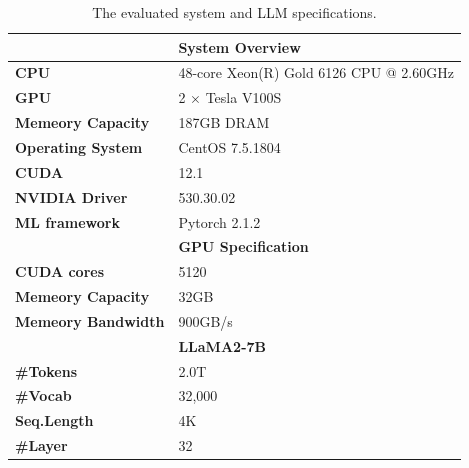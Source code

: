 \begin{table}[!hb]
\centering
\caption{The evaluated system and LLM specifications. }
\label{tab:system}
\begin{tabular}{ll} 
\toprule
                           & \textbf{System Overview}  \\
                           \midrule
\textbf{CPU}               & 48-core Xeon(R) Gold 6126 CPU @ 2.60GHz       \\
\textbf{GPU}               & 2 $\times$ Tesla V100S       \\
\textbf{Memeory Capacity}  & 187GB DRAM                                    \\
\textbf{Operating System}  & CentOS 7.5.1804                               \\
\textbf{CUDA}              & 12.1                                          \\
\textbf{NVIDIA Driver}     & 530.30.02                                     \\
\textbf{ML framework}      & Pytorch 2.1.2                                 \\
\midrule
                           & \textbf{GPU Specification }                            \\
\midrule
\textbf{CUDA cores}        & 5120                                          \\
\textbf{Memeory Capacity}  & 32GB                                          \\
\textbf{Memeory Bandwidth} & 900GB/s                                       \\
\midrule
                           & \textbf{LLaMA2-7B }                                    \\
\midrule
\textbf{\#Tokens}          & 2.0T                                          \\
\textbf{\#Vocab}           & 32,000                                        \\
\textbf{Seq.Length}        & 4K                                            \\
\textbf{\#Layer}           & 32                                            \\
\bottomrule
\end{tabular}
\end{table}

